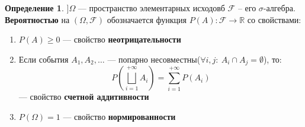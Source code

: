\documentclass[english]{article}
\newcommand{\R}{\mathbb{R}}
\theoremstyle{plain}
\theoremstyle{remark}
\theoremstyle{definition}
\newtheorem*{definition}{Определение}
\begin{document}
\begin{definition}
\(] \Omega\) --- пространство элементарных исходовб \(\mathcal{F}\) -- его \(\sigma\)-алгебра.
\textbf{Вероятностью} на \((\Omega, \mathcal{F})\) обозначается функция \(P(A): \mathcal{F} \to \R\) со свойствами:
\begin{enumerate}
\item \(P(A) \ge 0\) --- свойство \textbf{неотрицательности}
\item Если события \(A_1, A_2, \dots\) --- попарно несовместны(\(\forall i,j:\ A_i \cap A_j = \emptyset\)),
то: \[ P(\bigsqcup_{i = 1}^{+ \infty} A_i) = \sum_{i = 1}^{+ \infty} P(A_i) \] --- свойство \textbf{счетной аддитивности}
\item \(P(\Omega) = 1\) --- свойство \textbf{нормированности}
\end{enumerate}
\end{definition}
\end{document}
